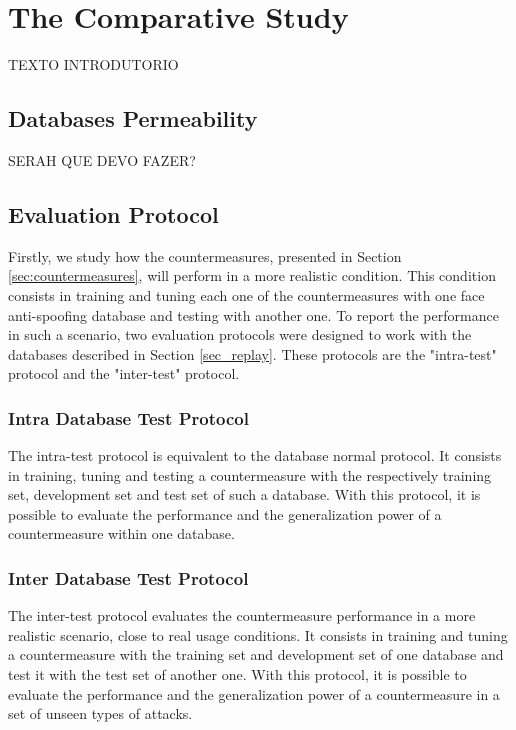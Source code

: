 \chapter{The Comparative Study}
\label{chap:Comparative_Study}

TEXTO INTRODUTORIO



\section{Databases Permeability}
\label{sec:Databases_Permeability}

SERAH QUE DEVO FAZER?

\section{Evaluation Protocol}
\label{sec:Evaluation_Protocol}

Firstly, we study how the countermeasures, presented in Section \ref{sec:countermeasures}, will perform in a more realistic condition. This condition consists in training and tuning each one of the countermeasures with one face anti-spoofing database and testing with another one. To report the performance in such a scenario, two evaluation protocols were designed to work with the databases described in Section \ref{sec_replay}. These protocols are the "intra-test" protocol and the "inter-test" protocol.


\subsection{Intra Database Test Protocol}

The intra-test protocol is equivalent to the database normal protocol. It consists in training, tuning and testing a countermeasure with the respectively training set, development set and test set of such a database. With this protocol, it is possible to evaluate the performance and the generalization power of a countermeasure within one database. 

\subsection{Inter Database Test Protocol}

The inter-test protocol evaluates the countermeasure performance in a more realistic scenario, close to real usage conditions. It consists in training and tuning a countermeasure with the training set and development set of one database and test it with the test set of another one. With this protocol, it is possible to evaluate the performance and the generalization power of a countermeasure in a set of unseen types of attacks.


